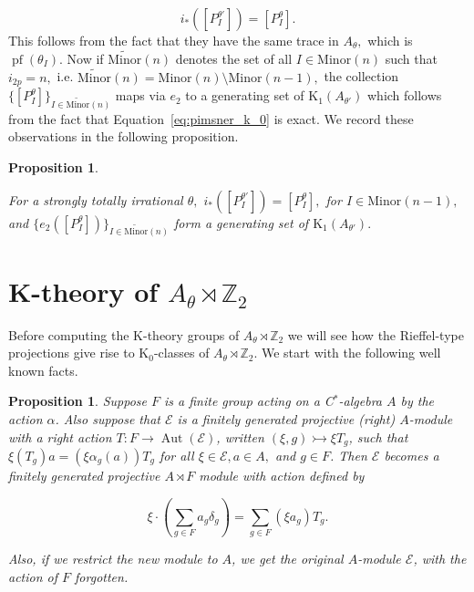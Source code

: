 \documentclass[9pt, BCOR=2mm]{amsart}
\numberwithin{equation}{section}
\numberwithin{equation}{section}
\newtheorem{proposition}[theorem]{Proposition}
\newcommand{\Z}{{\mathbb{Z}}}
\newcommand{\pf}{{\operatorname{pf}}}
\newcommand{\K}{\mathrm{K}} %
\DeclareMathOperator{\Aut}{Aut}
\newcommand{\m}[2]{\ensuremath{{#1}_{#2}}}
\begin{document}
\begin{equation}\label{eq:i_*_image}
	i_*([P_{I}^{\theta'}]) = [P_{I}^{\theta}].
\end{equation}
  This follows from the fact that they have the same trace in $A_\theta,$ which is $\pf(\m{\theta}{I}).$ Now if $ \widetilde{\mathrm{Minor}}(n)$ denotes the set of all  $I\in \mathrm{Minor}(n)$ such that $i_{2p}=n,$ i.e. $ \widetilde{\mathrm{Minor}}(n)= \mathrm{Minor}(n)\setminus \mathrm{Minor}(n-1),$  the collection $\{[P_{I}^{\theta}]\}_{I\in\widetilde{\mathrm{Minor}}(n)}$ maps via $e_2$ to a generating set of $\K_1(A_{\theta'})$ which follows from the fact that Equation~\ref{eq:pimsner_k_0} is exact. We record these observations in the following proposition.
  
 \begin{proposition}\label{prp:pv_image}
 
 For a strongly totally irrational $\theta,$ $i_*([P_{I}^{\theta'}]) = [P_{I}^{\theta}],$ for $ I\in \mathrm{Minor}(n-1),$  and $\{e_2([P_{I}^{\theta}])\}_{I\in \widetilde{\mathrm{Minor}}(n)}$ form a generating set of $\K_1(A_{\theta'}).$ 
 	
 \end{proposition}
         

 
 
	
	
	
	\section{K-theory of $A_\theta\rtimes \Z_2$}\label{sec:k-theory}
		
		Before computing the K-theory groups of 	$A_\theta\rtimes \Z_2$ we will see how the Rieffel-type projections give rise to $\K_0$-classes of $A_\theta\rtimes \Z_2.$ We start with the following well known facts.
		
		
		
	 \begin{proposition}\label{prop:mainprop}
	Suppose $F$ is a finite group acting on a C$^*$-algebra $A$ by the action $\alpha$. Also suppose that $\mathcal{E}$  is a finitely generated projective (right) $A$-module with a right action $T : F \rightarrow \Aut(\mathcal{E})$, written $(\xi, g) \rightarrowtail \xi T_g$, such that $\xi (T_g)a = (\xi\alpha_g(a)) T_g$ for all $\xi \in  \mathcal{E}, a \in A,$ and $g \in F$. Then $\mathcal{E}$ becomes a finitely generated projective $A\rtimes F$ module with action defined by
	
$$ \xi \cdot (\sum_{g \in F} a_g\delta_g) =  \sum_{g \in F} (\xi a_g)T_g.$$ 

Also, if we restrict the new module to $A$, we get the original $A$-module $\mathcal{E}$, with the action of $F$ forgotten. 
\end{proposition}
\end{document}
